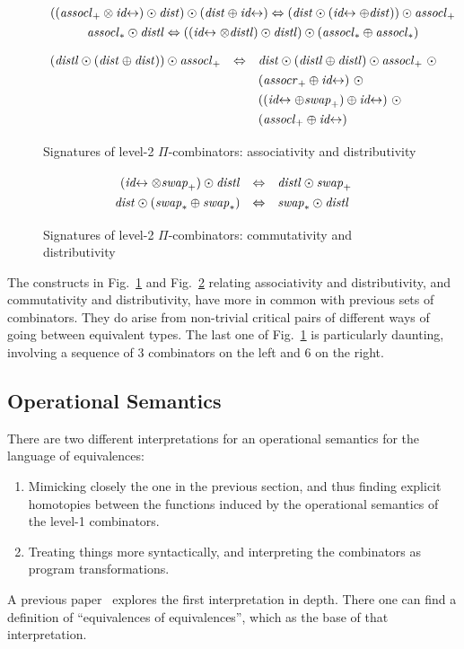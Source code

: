 \documentclass{article}
\newcommand{\swapp}{\ensuremath{\mathit{swap}_+}}
\newcommand{\assoclp}{\ensuremath{\mathit{assocl}_+}}
\newcommand{\assocrp}{\ensuremath{\mathit{assocr}_+}}
\newcommand{\swapt}{\ensuremath{\mathit{swap}_*}}
\newcommand{\assoclt}{\ensuremath{\mathit{assocl}_*}}
\newcommand{\dist}{\ensuremath{\mathit{dist}}}
\newcommand{\distl}{\ensuremath{\mathit{distl}}}
\newcommand{\idc}{\mathit{id}\!\!\leftrightarrow}
\begin{document}
\begin{figure}[t]
\[\def\arraystretch{1.3}
\begin{array}{c}
  {((\assoclp \otimes \idc) \odot \dist) \odot (\dist \oplus \idc) \Leftrightarrow (\dist \odot (\idc \oplus \dist)) \odot \assoclp}
\\
  {\assoclt \odot \distl \Leftrightarrow ((\idc \otimes \distl) \odot \distl) \odot (\assoclt \oplus \assoclt)}
\end{array}\]
\vspace{ -0.5em}
\[\def\arraystretch{1.3}
\begin{array}{rcl}
  (\distl \odot (\dist \oplus \dist)) \odot \assoclp &\Leftrightarrow&
   \dist \odot (\distl \oplus \distl) \odot \assoclp ~\odot \\
&& (\assocrp \oplus \idc) ~\odot \\
&& ((\idc \oplus \swapp) \oplus \idc) ~\odot \\
&&      (\assoclp \oplus \idc)
\end{array}\]
\caption{\label{figb}Signatures of level-2 $\Pi$-combinators: associativity and distributivity}
\end{figure}

\begin{figure}[t]
\[\def\arraystretch{1.3}
\begin{array}{rcl}
  (\idc \otimes \swapp) \odot \distl &\Leftrightarrow& \distl \odot \swapp
\\
  \dist \odot (\swapt \oplus \swapt) &\Leftrightarrow & \swapt \odot \distl
\end{array}\]
\caption{\label{figa}Signatures of level-2 $\Pi$-combinators: commutativity and distributivity}
\end{figure}

The constructs in Fig.~\ref{figb} and Fig.~\ref{figa} relating associativity and
distributivity, and commutativity and distributivity, have more in common with
previous sets of combinators.  They do arise from non-trivial critical pairs
of different ways of going between equivalent types. The last one of
Fig.~\ref{figb} is particularly daunting, involving a sequence of $3$ combinators
on the left and $6$ on the right.

\subsection{Operational Semantics}

There are two different interpretations for an operational semantics
for the language of equivalences:
\begin{enumerate}
\item Mimicking closely the one in the previous section, and
thus finding explicit homotopies between the functions induced
by the operational semantics of the level-1 combinators.
\item Treating things more syntactically, and interpreting
the combinators as program transformations.
\end{enumerate}
A previous paper~\cite{Carette2016} explores the first interpretation
in depth. There one can find a definition of ``equivalences of
equivalences'', which as the base of that interpretation.
\end{document}

